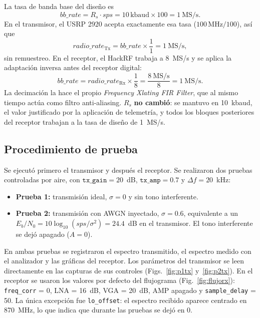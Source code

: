 \documentclass[conference]{IEEEtran}
\begin{document}
La tasa de banda base del diseño es
\begin{equation}
bb\_rate = R_s \cdot sps = 10\,\text{kbaud} \times 100 = 1~\text{MS/s}.
\end{equation}
En el transmisor, el USRP 2920 acepta exactamente esa tasa ($100\,\text{MHz}/100$), así que
\begin{equation}
radio\_rate_{\text{Tx}} = bb\_rate \times \frac{1}{1} = 1~\text{MS/s},
\end{equation}
sin remuestreo. En el receptor, el HackRF trabaja a 8~MS/s y se aplica la adaptación inversa antes del receptor digital:
\begin{equation}
bb\_rate = radio\_rate_{\text{Rx}} \times \frac{1}{8} = \frac{8~\text{MS/s}}{8} = 1~\text{MS/s}.
\end{equation}
La decimación la hace el propio \textit{Frequency Xlating FIR Filter}, que al mismo tiempo actúa como filtro anti-aliasing. $R_s$ \textbf{no cambió}: se mantuvo en 10~kbaud, el valor justificado por la aplicación de telemetría, y todos los bloques posteriores del receptor trabajan a la tasa de diseño de 1~MS/s.

\subsection{Procedimiento de prueba}

Se ejecutó primero el transmisor y después el receptor. Se realizaron dos pruebas controladas por aire, con $\texttt{tx\_gain} = 20$~dB, $\texttt{tx\_amp} = 0.7$ y $\Delta f = 20$~kHz:
\begin{itemize}
\item \textbf{Prueba 1:} transmisión ideal, $\sigma = 0$ y sin tono interferente.
\item \textbf{Prueba 2:} transmisión con AWGN inyectado, $\sigma = 0.6$, equivalente a un $E_b/N_0 = 10\log_{10}(sps/\sigma^2) = 24.4$~dB en el transmisor. El tono interferente se dejó apagado ($A = 0$).
\end{itemize}
En ambas pruebas se registraron el espectro transmitido, el espectro medido con el analizador y las gráficas del receptor. Los parámetros del transmisor se leen directamente en las capturas de sus controles (Figs.~\ref{fig:p1tx} y~\ref{fig:p2tx}). En el receptor se usaron los valores por defecto del flujograma (Fig.~\ref{fig:flujorx}): \texttt{freq\_corr} = 0, LNA = 16~dB, VGA = 20~dB, AMP apagado y \texttt{sample\_delay} = 50. La única excepción fue \texttt{lo\_offset}: el espectro recibido aparece centrado en 870~MHz, lo que indica que durante las pruebas se dejó en 0.
\end{document}

